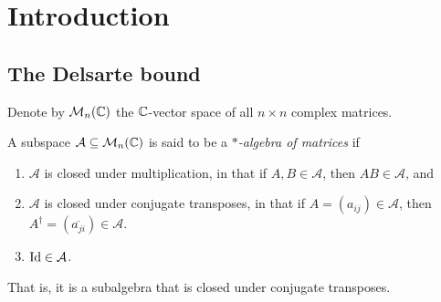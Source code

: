 
\section{Introduction}

\subsection{The Delsarte bound}

	Denote by $\mathcal{M}_n(\mathbb{C})$ the $\mathbb{C}$-vector space of all $n \times n$ complex matrices.

	\begin{fdef}
		A subspace $\mathcal{A} \subseteq \mathcal{M}_n(\mathbb{C})$ is said to be a \emph{$*$-algebra of matrices} if
		\begin{enumerate}
			\item $\mathcal{A}$ is closed under multiplication, in that if $A,B \in \mathcal{A}$, then $AB \in \mathcal{A}$, and
			\item $\mathcal{A}$ is closed under conjugate transposes, in that if $A = (a_{ij}) \in \mathcal{A}$, then $A^\dagger = (\overline{a_{ji}}) \in \mathcal{A}$.
			\item $\operatorname{Id} \in \mathcal{A}$.
		\end{enumerate}
	\end{fdef}

	That is, it is a subalgebra that is closed under conjugate transposes.


